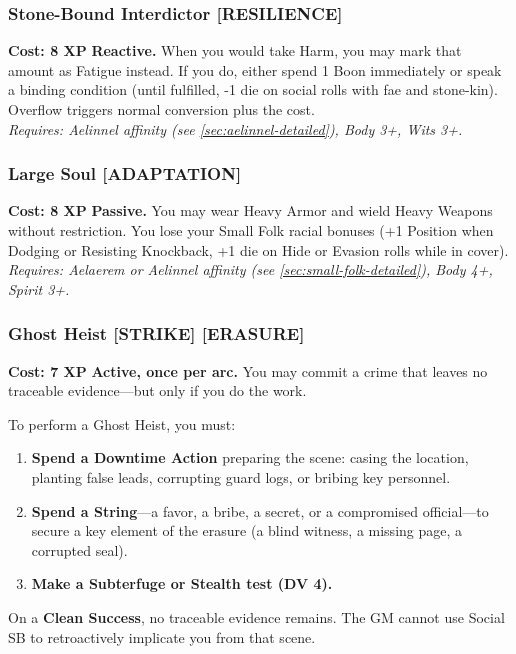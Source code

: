 \subsubsection*{Stone-Bound Interdictor \textnormal{[RESILIENCE]}}
\label{talent:stone-bound-interdictor}
\textbf{Cost: 8 XP} \textbf{Reactive.} When you would take Harm, you may mark that amount as Fatigue instead. If you do, either spend 1 Boon immediately or speak a binding condition (until fulfilled, -1 die on social rolls with fae and stone-kin). Overflow triggers normal conversion plus the cost. \\
\textit{Requires: Aelinnel affinity (see \ref{sec:aelinnel-detailed}), Body 3+, Wits 3+.}

\subsubsection*{Large Soul \textnormal{[ADAPTATION]}}
\label{talent:large-soul}
\textbf{Cost: 8 XP} \textbf{Passive.} You may wear Heavy Armor and wield Heavy Weapons without restriction. You lose your Small Folk racial bonuses (+1 Position when Dodging or Resisting Knockback, +1 die on Hide or Evasion rolls while in cover). \\
\textit{Requires: Aelaerem or Aelinnel affinity (see \ref{sec:small-folk-detailed}), Body 4+, Spirit 3+.}

\subsubsection*{Ghost Heist \textnormal{[STRIKE] [ERASURE]}}
\label{talent:ghost-heist}
\textbf{Cost: 7 XP} \textbf{Active, once per arc.} You may commit a crime that leaves no traceable evidence---but only if you do the work.

To perform a Ghost Heist, you must:
\begin{enumerate}
    \item \textbf{Spend a Downtime Action} preparing the scene: casing the location, planting false leads, corrupting guard logs, or bribing key personnel.
    \item \textbf{Spend a String}---a favor, a bribe, a secret, or a compromised official---to secure a key element of the erasure (a blind witness, a missing page, a corrupted seal).
    \item \textbf{Make a Subterfuge or Stealth test (DV 4).}
\end{enumerate}

On a \textbf{Clean Success}, no traceable evidence remains. The GM cannot use Social SB to retroactively implicate you from that scene.

